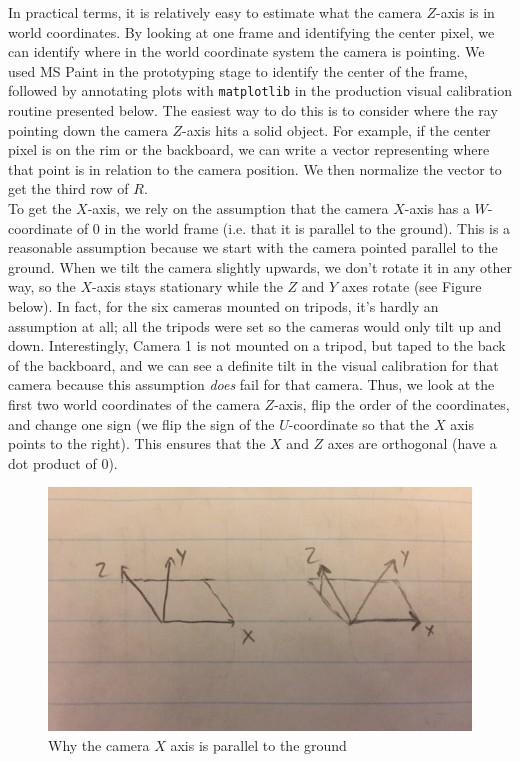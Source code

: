 \documentclass{article}
\begin{document}
In practical terms, it is relatively easy to estimate what the camera $Z$-axis is in world coordinates. 
By looking at one frame and identifying the center pixel, we can identify where in the world coordinate system the camera is pointing. 
We used MS Paint in the prototyping stage to identify the center of the frame, followed by annotating plots with \texttt{matplotlib} in the
production visual calibration routine presented below.
The easiest way to do this is to consider where the ray pointing down the camera $Z$-axis hits a solid object. 
For example, if the center pixel is on the rim or the backboard, we can write a vector representing where that point is in relation to the camera position. 
We then normalize the vector to get the third row of $R$. \\

To get the $X$-axis, we rely on the assumption that the camera $X$-axis has a $W$-coordinate of 0 in the world frame (i.e. that it is parallel to the ground). 
This is a reasonable assumption because we start with the camera pointed parallel to the ground.  
When we tilt the camera slightly upwards, we don't rotate it in any other way, so the $X$-axis stays stationary while the $Z$ and $Y$ axes rotate (see Figure below). 
In fact, for the six cameras mounted on tripods, it's hardly an assumption at all; all the tripods were set so the cameras would only tilt up and down.
Interestingly, Camera 1 is not mounted on a tripod, but taped to the back of the backboard, and we can see a definite tilt
in the visual calibration for that camera because this assumption \textit{does} fail for that camera.
Thus, we look at the first two world coordinates of the camera $Z$-axis, flip the order of the coordinates, 
and change one sign (we flip the sign of the $U$-coordinate so that the $X$ axis points to the right). 
This ensures that the $X$ and $Z$ axes are orthogonal (have a dot product of 0). \\

\begin{figure}[H]
\includegraphics[scale=0.6]{Rotation_Diagram}
\centering
\caption*{Why the camera $X$ axis is parallel to the ground}
\end{figure}
\end{document}
